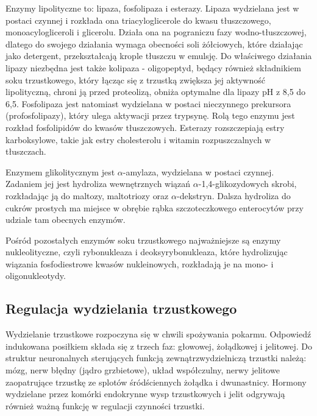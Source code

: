 \documentclass[a4paper, 12pt]{report}
\begin{document}
Enzymy lipolityczne to: lipaza, fosfolipaza i esterazy. Lipaza
wydzielana jest w postaci czynnej i rozkłada ona triacyloglicerole do
kwasu tłuszczowego, monoacylogliceroli i glicerolu. Działa ona na
pograniczu fazy wodno-tłuszczowej, dlatego do swojego działania wymaga
obecności soli żółciowych, które działając jako detergent,
przekształcają krople tłuszczu w emulsję. Do właściwego działania
lipazy niezbędna jest także kolipaza - oligopeptyd, będący również
składnikiem soku trzustkowego, który łącząc się z trzustką zwiększa
jej aktywność lipolityczną, chroni ją przed proteolizą, obniża
optymalne dla lipazy pH z 8,5 do 6,5. Fosfolipaza jest natomiast
wydzielana w postaci nieczynnego prekursora (profosfolipazy), który
ulega aktywacji przez trypsynę. Rolą tego enzymu jest rozkład
fosfolipidów do kwasów tłuszczowych. Esterazy rozszczepiają estry karboksylowe, takie jak
estry cholesterolu i witamin rozpuszczalnych w tłuszczach.

Enzymem glikolitycznym jest $\alpha$-amylaza, wydzielana w postaci
czynnej. Zadaniem jej jest hydroliza wewnętrznych wiązań
$\alpha$-1,4-glikozydowych skrobi, rozkładając ją do maltozy,
maltotriozy oraz $\alpha$-dekstryn. Dalsza hydroliza do cukrów
prostych ma miejsce w obrębie rąbka szczoteczkowego enterocytów przy
udziale tam obecnych enzymów.

Pośród pozostałych enzymów soku trzustkowego najważniejsze są enzymy
nukleolityczne, czyli rybonukleaza i deoksyrybonukleaza, które
hydrolizując wiązania fosfodiestrowe kwasów nukleinowych, rozkładają
je na mono- i oligonukleotydy.

\subsection{Regulacja wydzielania trzustkowego}
Wydzielanie trzustkowe rozpoczyna się w chwili spożywania
pokarmu. Odpowiedź indukowana posiłkiem składa się z trzech faz:
głowowej, żołądkowej i jelitowej. Do struktur neuronalnych
sterujących funkcją zewnątrzwydzielniczą trzustki należą: mózg, nerw
błędny (jądro grzbietowe), układ współczulny, nerwy jelitowe
zaopatrujące trzustkę ze splotów śródściennych żołądka i dwunastnicy.
Hormony wydzielane przez komórki endokrynne wysp trzustkowych i jelit
odgrywają również ważną funkcję w regulacji czynności trzustki.
\end{document}
